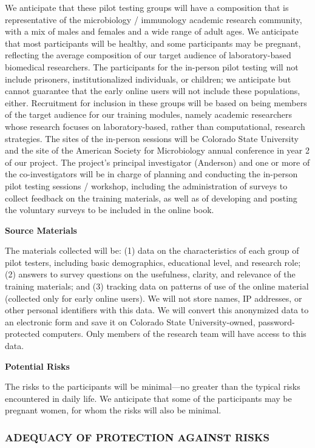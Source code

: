 \documentclass[pdftex,english,11.5pt,parskip=half]{scrartcl}
\begin{document}
We anticipate that these pilot testing groups will have a composition that is
representative of the microbiology / immunology academic research community, with a mix of males and females and a wide range of adult ages. We anticipate that most participants will be healthy, and some participants may be pregnant, reflecting the average composition of our target audience of laboratory-based biomedical researchers. The participants for the in-person pilot testing will not include prisoners, institutionalized
individuals, or children; we anticipate but cannot guarantee that the early online users will not include these populations, either. Recruitment for inclusion in these groups will be based on being members of
the target audience for our training modules, namely academic researchers whose research
focuses on laboratory-based, rather than computational, research strategies.
The sites of the in-person sessions will be Colorado State University and the site of the
American Society for Microbiology annual conference in year 2 of our project. The project's principal investigator
(Anderson) and one or more of the co-investigators will be in charge of planning and 
conducting the in-person pilot testing sessions / workshop, including the administration of 
surveys to collect feedback on the training materials, as well as of developing and posting the voluntary surveys to be included in the online book. 

\textbf{Source Materials}

The materials collected will be: (1) data on the characteristics of each group 
of pilot testers, including basic demographics, educational level, and research role; 
(2) answers to survey questions on the usefulness, clarity,
and relevance of the training materials; and (3) tracking data on patterns of use 
of the online material (collected only for early online users). We will not store 
names, IP addresses, or other personal identifiers with this data. We will convert
this anonymized data to an electronic form and save it on Colorado State University-owned, password-protected computers. Only members of the research team will have access to 
this data. 

\textbf{Potential Risks}

The risks to the participants will be minimal---no greater than the typical risks encountered in daily life. We anticipate that some of the participants may be pregnant women, for whom the risks will also be minimal.

\subsubsection*{ADEQUACY OF PROTECTION AGAINST RISKS}
\end{document}
